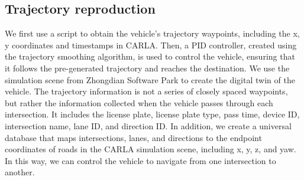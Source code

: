 \subsection{Trajectory reproduction}

We first use a script to obtain the vehicle's trajectory waypoints, including the x, y coordinates and timestamps in CARLA.
Then, a PID controller, created using the trajectory smoothing algorithm, is used to control the vehicle, ensuring that it follows the pre-generated trajectory and reaches the destination.
We use the simulation scene from Zhongdian Software Park to create the digital twin of the vehicle.
The trajectory information is not a series of closely spaced waypoints, but rather the information collected when the vehicle passes through each intersection. It includes the license plate, license plate type, pass time, device ID, intersection name, lane ID, and direction ID.
In addition, we create a universal database that maps intersections, lanes, and directions to the endpoint coordinates of roads in the CARLA simulation scene, including x, y, z, and yaw.
In this way, we can control the vehicle to navigate from one intersection to another.
